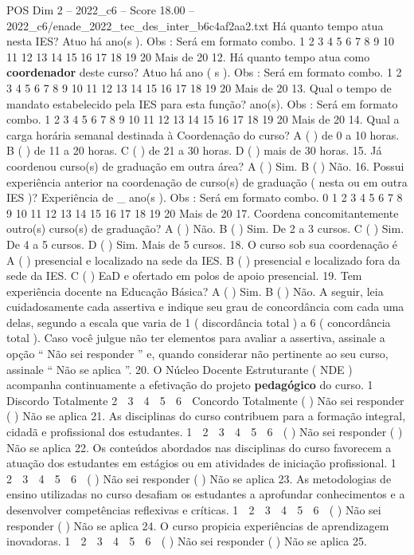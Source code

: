 \begin{textsample}{POS Dim 2 – 2022\_c6 – Score 18.00 – 2022\_c6/enade\_2022\_tec\_des\_inter\_b6c4af2aa2.txt}
Há quanto tempo atua nesta IES?
Atuo há ano(s ).
Obs : Será em formato combo. 1 2 3 4 5 6 7 8 9 10 11 12 13 14 15 16 17 18 19 20 Mais de 20 12.
Há quanto tempo atua como \textbf{coordenador} deste curso?
Atuo há ano ( s ).
Obs : Será em formato combo. 1 2 3 4 5 6 7 8 9 10 11 12 13 14 15 16 17 18 19 20 Mais de 20 13.
Qual o tempo de mandato estabelecido pela IES para esta função? ano(s).
Obs : Será em formato combo. 1 2 3 4 5 6 7 8 9 10 11 12 13 14 15 16 17 18 19 20 Mais de 20 14.
Qual a carga horária semanal destinada à Coordenação do curso?
A ( ) de 0 a 10 horas.
B ( ) de 11 a 20 horas.
C ( ) de 21 a 30 horas.
D ( ) mais de 30 horas. 15.
Já coordenou curso(s) de graduação em outra área?
A ( ) Sim.
B ( ) Não. 16.
Possui experiência anterior na coordenação de curso(s) de graduação ( nesta ou em outra IES )?
Experiência de \_ ano(s ).
Obs : Será em formato combo. 0 1 2 3 4 5 6 7 8 9 10 11 12 13 14 15 16 17 18 19 20 Mais de 20 17.
Coordena concomitantemente outro(s) curso(s) de graduação?
A ( ) Não.
B ( ) Sim.
De 2 a 3 cursos.
C ( ) Sim.
De 4 a 5 cursos.
D ( ) Sim.
Mais de 5 cursos. 18.
O curso sob sua coordenação é A ( ) presencial e localizado na sede da IES.
B ( ) presencial e localizado fora da sede da IES.
C ( ) EaD e ofertado em polos de apoio presencial. 19.
Tem experiência docente na Educação Básica?
A ( ) Sim.
B ( ) Não.
A seguir, leia cuidadosamente cada assertiva e indique seu grau de concordância com cada uma delas, segundo a escala que varia de 1 ( discordância total ) a 6 ( concordância total ).
Caso você julgue não ter elementos para avaliar a assertiva, assinale a opção “ Não sei responder ” e, quando considerar não pertinente ao seu curso, assinale “ Não se aplica ”. 20.
O Núcleo Docente Estruturante ( NDE ) acompanha continuamente a efetivação do projeto \textbf{pedagógico} do curso. 1 ⃝ Discordo Totalmente 2 ⃝ 3 ⃝ 4 ⃝ 5 ⃝ 6 ⃝ Concordo Totalmente ( ) Não sei responder ( ) Não se aplica 21.
As disciplinas do curso contribuem para a formação integral, cidadã e profissional dos estudantes. 1 ⃝ 2 ⃝ 3 ⃝ 4 ⃝ 5 ⃝ 6 ⃝ ( ) Não sei responder ( ) Não se aplica 22.
Os conteúdos abordados nas disciplinas do curso favorecem a atuação dos estudantes em estágios ou em atividades de iniciação profissional. 1 ⃝ 2 ⃝ 3 ⃝ 4 ⃝ 5 ⃝ 6 ⃝ ( ) Não sei responder ( ) Não se aplica 23.
As metodologias de ensino utilizadas no curso desafiam os estudantes a aprofundar conhecimentos e a desenvolver competências reflexivas e críticas. 1 ⃝ 2 ⃝ 3 ⃝ 4 ⃝ 5 ⃝ 6 ⃝ ( ) Não sei responder ( ) Não se aplica 24.
O curso propicia experiências de aprendizagem inovadoras. 1 ⃝ 2 ⃝ 3 ⃝ 4 ⃝ 5 ⃝ 6 ⃝ ( ) Não sei responder ( ) Não se aplica 25.

\end{textsample}
